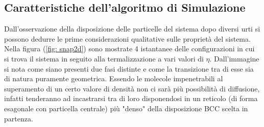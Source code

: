 \documentclass[11pt]{article}
\theoremstyle{plain}
\theoremstyle{remark}
\begin{document}
\FloatBarrier
\subsection{Caratteristiche dell'algoritmo di Simulazione}
Dall'osservazione della disposizione delle particelle del sistema dopo diversi urti si possono dedurre le prime considerazioni qualitative sulle proprietà del sistema.
Nella figura (\ref{fig: snap2d}) sono mostrate 4 istantanee delle configurazioni in cui si trova il sistema in seguito alla termalizzazione a vari valori di $\eta$.
Dall'immagine si nota come siano presenti due fasi distinte e come la transizione tra di esse sia di natura puramente geometrica. Essendo le molecole impenetrabili al superamento di un certo valore di densità non ci sarà più possibilità di diffusione, infatti tenderanno ad incastrarsi tra di loro  disponendosi in un reticolo (di forma esagonale con particella centrale) più "denso" della disposizione BCC scelta in partenza.
\end{document}

